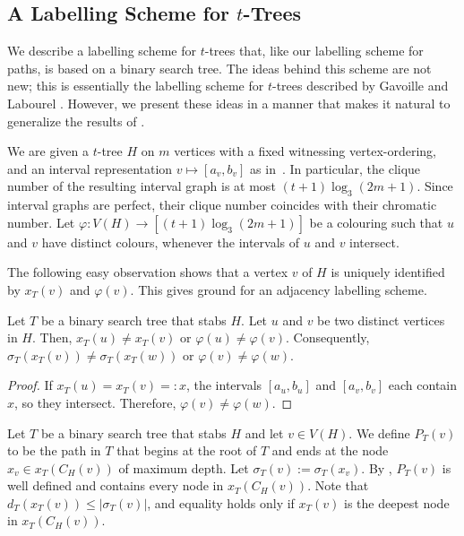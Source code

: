 \documentclass[kpfonts]{patmorin}
\let\le\leqslant
\begin{document}
\subsection{A Labelling Scheme for $t$-Trees}

We describe a labelling scheme for $t$-trees that, like our labelling scheme for paths, is based on a binary search tree.  The ideas behind this scheme are not new; this is essentially the labelling scheme for $t$-trees described by Gavoille and Labourel \cite{gavoille.labourel:shorter}.  However, we present these ideas in a manner that makes it natural to generalize the results of .


We are given a $t$-tree $H$ on $m$ vertices with a fixed witnessing vertex-ordering,
and an interval representation $v\mapsto[a_v,b_v]$ as in~. 
In particular, the clique number of the resulting interval graph is at most $(t+1)\log_3 (2m+1)$.
Since interval graphs are perfect, their clique number coincides with their chromatic number.
Let $\varphi: V(H) \to [(t+1)\log_3 (2m+1)]$ be a colouring such that $u$ and $v$ have distinct colours, whenever the intervals of $u$ and $v$ intersect. 

The following easy observation shows that a vertex $v$ of $H$ is uniquely identified by 
$x_T(v)$ and $\varphi(v)$. This gives ground for an adjacency labelling scheme.

\begin{obs}
    Let $T$ be a binary search tree that stabs $H$.
    Let $u$ and $v$ be two distinct vertices in $H$. 
    Then, $x_T(u)\neq x_T(v)$ or $\varphi(u)\neq\varphi(v)$. 
    Consequently, $\sigma_T(x_T(v))\neq \sigma_T(x_T(w))$ or $\varphi(v)\neq\varphi(w)$.
\end{obs}

\begin{proof}
  If $x_T(u)=x_T(v)=:x$, the intervals $[a_u,b_u]$ and $[a_v,b_v]$ each contain $x$, 
  so they intersect. 
  Therefore, $\varphi(v)\neq\varphi(w)$.%
\end{proof}

Let $T$ be a binary search tree that stabs $H$ and let $v\in V(H)$.
We define $P_T(v)$ to be the path in $T$ that begins at the root of $T$ and ends at the node  $x_v \in x_T(C_H(v))$ of maximum depth. Let $\sigma_T(v):=\sigma_T(x_v)$.
By , $P_T(v)$ is well defined and contains every node in $x_T(C_H(v))$. 
Note that $ d_T(x_T(v))\le |\sigma_T(v)|$, and equality holds only if $x_T(v)$ is the deepest node in $x_T(C_H(v))$.
\end{document}
